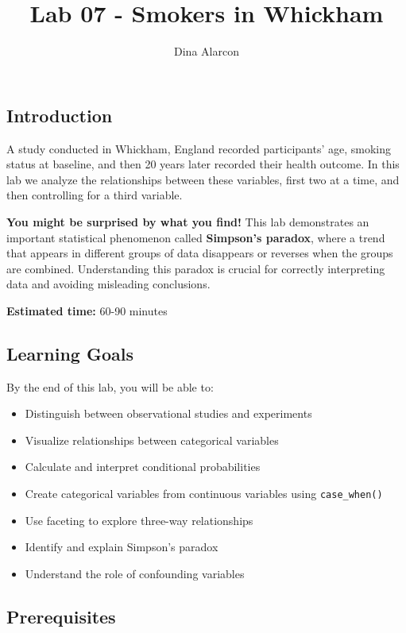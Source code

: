 \documentclass[]{tufte-handout}
\title{Lab 07 - Smokers in Whickham}
\author{Dina Alarcon}
\date{}
\providecommand{\tightlist}{%
  \setlength{\itemsep}{0pt}\setlength{\parskip}{0pt}}
\begin{document}
\maketitle




\subsection{Introduction}\label{introduction}

A study conducted in Whickham, England recorded participants' age,
smoking status at baseline, and then 20 years later recorded their
health outcome. In this lab we analyze the relationships between these
variables, first two at a time, and then controlling for a third
variable.

\textbf{You might be surprised by what you find!} This lab demonstrates
an important statistical phenomenon called \textbf{Simpson's paradox},
where a trend that appears in different groups of data disappears or
reverses when the groups are combined. Understanding this paradox is
crucial for correctly interpreting data and avoiding misleading
conclusions.

\textbf{Estimated time:} 60-90 minutes

\subsection{Learning Goals}\label{learning-goals}

By the end of this lab, you will be able to:

\begin{itemize}
\tightlist
\item
  Distinguish between observational studies and experiments
\item
  Visualize relationships between categorical variables
\item
  Calculate and interpret conditional probabilities
\item
  Create categorical variables from continuous variables using
  \texttt{case\_when()}
\item
  Use faceting to explore three-way relationships
\item
  Identify and explain Simpson's paradox
\item
  Understand the role of confounding variables
\end{itemize}

\subsection{Prerequisites}\label{prerequisites}
\end{document}
